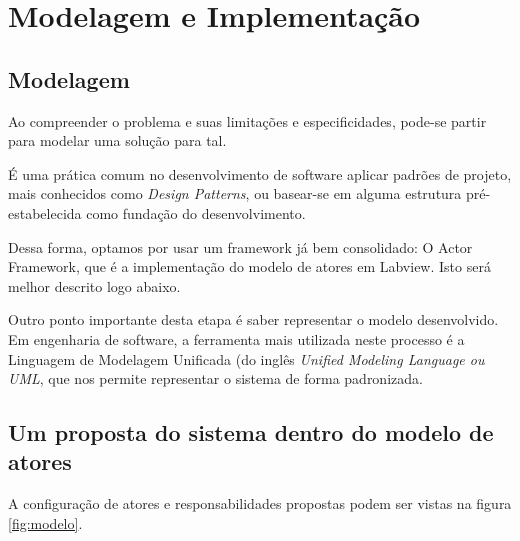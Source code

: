 \chapter{Modelagem e Implementação}
    \section{Modelagem}
        
        
        Ao compreender o problema e suas limitações e especificidades, pode-se partir para modelar uma solução para tal.
        
        É uma prática comum no desenvolvimento de software aplicar padrões de projeto, mais conhecidos como \textit{Design Patterns}, ou basear-se em alguma estrutura pré-estabelecida como fundação do desenvolvimento.
        
        Dessa forma, optamos por usar um framework já bem consolidado: O Actor Framework, que é a implementação do modelo de atores em Labview. Isto será melhor descrito logo abaixo.
        
        Outro ponto importante desta etapa é saber representar o modelo desenvolvido. Em engenharia de software, a ferramenta mais utilizada neste processo é a Linguagem de Modelagem Unificada (do inglês \textit{Unified Modeling Language ou UML}, que nos permite representar o sistema de forma padronizada.
        
                
    \section{Um proposta do sistema dentro do modelo de atores}     
        A configuração de atores e responsabilidades propostas podem ser vistas na figura \ref{fig:modelo}. 
        
